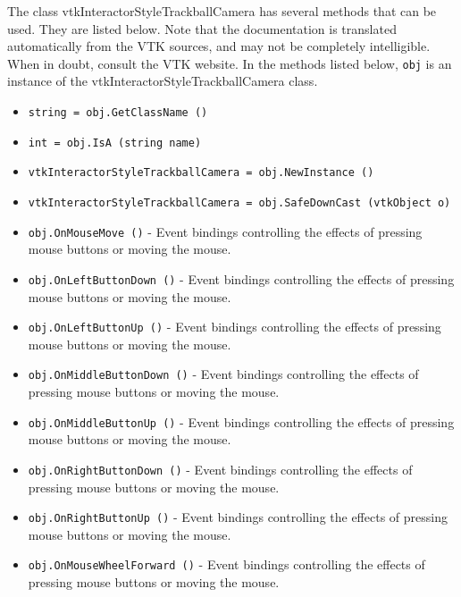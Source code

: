 The class vtkInteractorStyleTrackballCamera has several methods that can be used.
  They are listed below.
Note that the documentation is translated automatically from the VTK sources,
and may not be completely intelligible.  When in doubt, consult the VTK website.
In the methods listed below, \verb|obj| is an instance of the vtkInteractorStyleTrackballCamera class.
\begin{itemize}
\item  \verb|string = obj.GetClassName ()|

\item  \verb|int = obj.IsA (string name)|

\item  \verb|vtkInteractorStyleTrackballCamera = obj.NewInstance ()|

\item  \verb|vtkInteractorStyleTrackballCamera = obj.SafeDownCast (vtkObject o)|

\item  \verb|obj.OnMouseMove ()| -  Event bindings controlling the effects of pressing mouse buttons
 or moving the mouse.

\item  \verb|obj.OnLeftButtonDown ()| -  Event bindings controlling the effects of pressing mouse buttons
 or moving the mouse.

\item  \verb|obj.OnLeftButtonUp ()| -  Event bindings controlling the effects of pressing mouse buttons
 or moving the mouse.

\item  \verb|obj.OnMiddleButtonDown ()| -  Event bindings controlling the effects of pressing mouse buttons
 or moving the mouse.

\item  \verb|obj.OnMiddleButtonUp ()| -  Event bindings controlling the effects of pressing mouse buttons
 or moving the mouse.

\item  \verb|obj.OnRightButtonDown ()| -  Event bindings controlling the effects of pressing mouse buttons
 or moving the mouse.

\item  \verb|obj.OnRightButtonUp ()| -  Event bindings controlling the effects of pressing mouse buttons
 or moving the mouse.

\item  \verb|obj.OnMouseWheelForward ()| -  Event bindings controlling the effects of pressing mouse buttons
 or moving the mouse.


\end{itemize}
